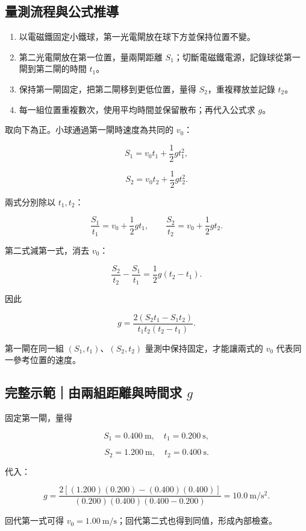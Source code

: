 \documentclass[11pt,a4paper]{article}
\providecommand{\tightlist}{%
  \setlength{\itemsep}{0pt}\setlength{\parskip}{0pt}}
\begin{document}
\subsection{量測流程與公式推導}\label{ux91cfux6e2cux6d41ux7a0bux8207ux516cux5f0fux63a8ux5c0e}

\begin{enumerate}
\def\labelenumi{\arabic{enumi}.}
\tightlist
\item
  以電磁鐵固定小鐵球，第一光電閘放在球下方並保持位置不變。
\item
  第二光電閘放在第一位置，量兩閘距離 \(S_1\)；切斷電磁鐵電源，記錄球從第一閘到第二閘的時間 \(t_1\)。
\item
  保持第一閘固定，把第二閘移到更低位置，量得 \(S_2\)，重複釋放並記錄 \(t_2\)。
\item
  每一組位置重複數次，使用平均時間並保留散布；再代入公式求 \(g\)。
\end{enumerate}

取向下為正。小球通過第一閘時速度為共同的 \(v_0\)：

\[
S_1=v_0t_1+\frac12gt_1^2,
\]

\[
S_2=v_0t_2+\frac12gt_2^2.
\]

兩式分別除以 \(t_1,t_2\)：

\[
\frac{S_1}{t_1}=v_0+\frac12gt_1,
\qquad
\frac{S_2}{t_2}=v_0+\frac12gt_2.
\]

第二式減第一式，消去 \(v_0\)：

\[
\frac{S_2}{t_2}-\frac{S_1}{t_1}
=\frac12g(t_2-t_1).
\]

因此

\[
\boxed{
g=\frac{2(S_2t_1-S_1t_2)}{t_1t_2(t_2-t_1)}
}.
\]

第一閘在同一組 \((S_1,t_1)\)、\((S_2,t_2)\) 量測中保持固定，才能讓兩式的 \(v_0\) 代表同一參考位置的速度。

\begin{HandoutWorkedExample}

\subsection{\texorpdfstring{完整示範｜由兩組距離與時間求 \(g\)}{完整示範｜由兩組距離與時間求 g}}\label{ux5b8cux6574ux793aux7bc4ux7531ux5169ux7d44ux8dddux96e2ux8207ux6642ux9593ux6c42-g}

固定第一閘，量得

\[
S_1=0.400\ \mathrm m,\quad t_1=0.200\ \mathrm s,
\]

\[
S_2=1.200\ \mathrm m,\quad t_2=0.400\ \mathrm s.
\]

代入：

\[
g=\frac{2[(1.200)(0.200)-(0.400)(0.400)]}
{(0.200)(0.400)(0.400-0.200)}
=10.0\ \mathrm{m/s^2}.
\]

回代第一式可得 \(v_0=1.00\ \mathrm{m/s}\)；回代第二式也得到同值，形成內部檢查。

\end{HandoutWorkedExample}
\end{document}
